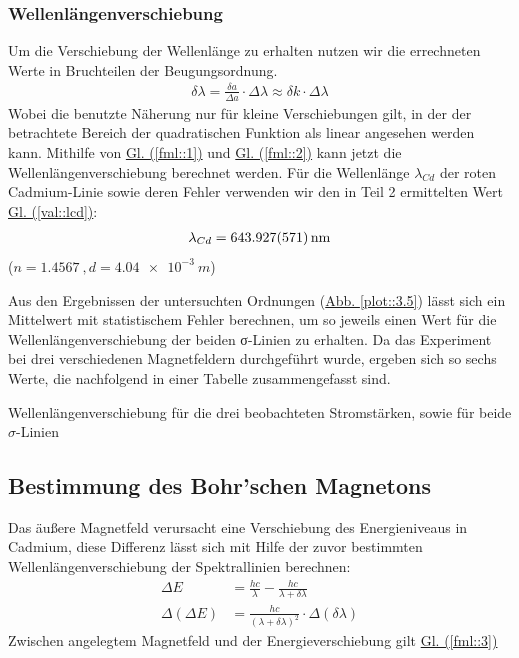       \subsubsection{Wellenlängenverschiebung}
        Um die Verschiebung der Wellenlänge zu erhalten nutzen wir die errechneten Werte in Bruchteilen der Beugungsordnung.
        \begin{align}
          \delta \lambda = \frac{\delta a}{\Delta a}\cdot \Delta \lambda \approx \delta k\cdot \Delta\lambda \label{fml::2}
        \end{align}
        Wobei die benutzte Näherung nur für kleine Verschiebungen gilt, in der der betrachtete Bereich der quadratischen Funktion als linear angesehen werden kann. Mithilfe von \hyperref[fml::1]{Gl. (\ref*{fml::1})}
        und \hyperref[fml::2]{Gl. (\ref*{fml::2})} kann jetzt die Wellenlängenverschiebung berechnet werden. Für die Wellenlänge $\lambda_{Cd}$ der roten Cadmium-Linie sowie deren Fehler verwenden wir den in Teil 2 ermittelten Wert \hyperref[val::lcd]{Gl. (\ref*{val::lcd})}:
        \begin{align}
          \lambda_{Cd} = \SI{643.927+-0.571}{\nano\metre}
        \end{align}
        ($n = \SI{1.4567}{}, d=\SI{4.04e-3}{m}$)

        Aus den Ergebnissen der untersuchten Ordnungen (\hyperref[plot::3.5]{Abb. \ref*{plot::3.5}}) lässt sich ein Mittelwert mit statistischem Fehler berechnen, um so jeweils einen Wert für die Wellenlängenverschiebung der beiden σ-Linien zu erhalten. Da das Experiment bei drei verschiedenen Magnetfeldern durchgeführt wurde, ergeben sich so sechs Werte, die nachfolgend in einer Tabelle zusammengefasst sind.
        \begin{table}[H]
          \centering
          
          \caption{Wellenlängenverschiebung für die drei beobachteten Stromstärken, sowie für beide $\sigma$-Linien}
          \label{tab::1}
        \end{table}

      \subsection{Bestimmung des Bohr'schen Magnetons}
        Das äußere Magnetfeld verursacht eine Verschiebung des Energieniveaus in Cadmium, diese Differenz lässt sich mit Hilfe der zuvor bestimmten Wellenlängenverschiebung der Spektrallinien berechnen:
        \begin{align}
          \Delta E         &= \frac{hc}\lambda-\frac{hc}{\lambda+\delta\lambda}\\
          \Delta(\Delta E) &= \frac{hc}{(\lambda+\delta\lambda)^2}\cdot\Delta(\delta\lambda)
        \end{align}
        Zwischen angelegtem Magnetfeld und der Energieverschiebung gilt \hyperref[fml::3]{Gl. (\ref*{fml::3})}

